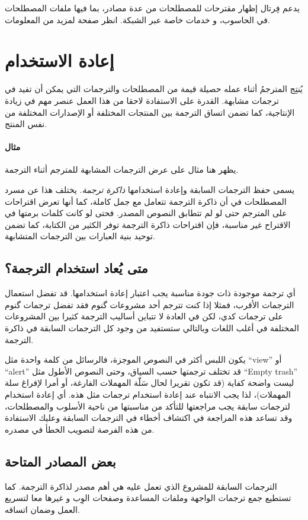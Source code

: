 يدعم فِرتال إظهار مقترحات للمصطلحات من عدة مصادر، بما فيها ملفات
المصطلحات في الحاسوب، و خدمات خاصة عبر الشبكة. انظر صفحة
 لمزيد من المعلومات.

\chapter{إعادة الاستخدام}
يُنتِج المترجمُ أثناء عمله حصيلة قيمة من المصطلحات والترجمات التي يمكن
أن تفيد في ترجمات مشابهة. القدرة على الاستفادة لاحقا من هذا العمل عنصر
مهم في زيادة الإنتاجية، كما تضمن اتساق الترجمة بين المنتجات المختلفة أو
الإصدارات المختلفة من نفس المنتج.

\subsubsection{مثال}
يظهر هنا مثال على عرض الترجمات المشابهة للمترجم أثناء الترجمة.



يسمى حفظ الترجمات السابقة وإعادة استخدامها {\it ذاكرة ترجمة}. يختلف هذا
عن مسرد المصطلحات في أن ذاكرة الترجمة تتعامل مع جمل كاملة، كما أنها
تعرض اقتراحات على المترجم حتى لو لم تتطابق النصوص المصدر. فحتى لو كانت
كلمات برمتها في الاقتراح غير مناسبة، فإن اقتراحات ذاكرة الترجمة توفر
الكثير من الكتابة، كما تضمن توحيد بنية العبارات بين الترجمات المتشابهة.

\section{متى يُعاد استخدام الترجمة؟}
أي ترجمة موجودة ذات جودة مناسبة يجب اعتبار إعادة استخدامها. قد تفضل
استعمال الترجمات الأقرب، فمثلا إذا كنت تترجم أحد مشروعات گنوم فقد تفضل
ترجمات گنوم على ترجمات كدي، لكن في العادة لا تتباين أساليب الترجمة
كثيرا بين المشروعات المختلفة في أغلب اللغات وبالتالي ستستفيد من وجود كل
الترجمات السابقة في ذاكرة الترجمة.

يكون اللبس أكثر في النصوص الموجزة، فالرسائل من كلمة واحدة مثل “view” أو
“alert” قد تختلف ترجمتها حسب السياق، وحتى النصوص الأطول مثل “Empty
trash” ليست واضحة كفاية (قد تكون تقريرا لحال سَلّة المهملات الفارغة، أو
أمرا لإفراغ سلة المهملات)، لذا يجب الانتباه عند إعادة استخدام ترجمات
مثل هذه. أي إعادة استخدام لترجمات سابقة يجب مراجعتها للتأكد من مناسبتها
من ناحية الأسلوب والمصطلحات، وقد تساعد هذه المراجعة في اكتشاف أخطاء في
الترجمات السابقة وعليك الاستفادة من هذه الفرصة لتصويب الخطأ في مصدره.

\section{بعض المصادر المتاحة}
الترجمات السابقة للمشروع الذي تعمل عليه هي أهم مصدر لذاكرة الترجمة. كما
تستطيع جمع ترجمات الواجهة وملفات المساعدة وصفحات الوِب و غيرها معا
لتسريع العمل وضمان اتساقه.

